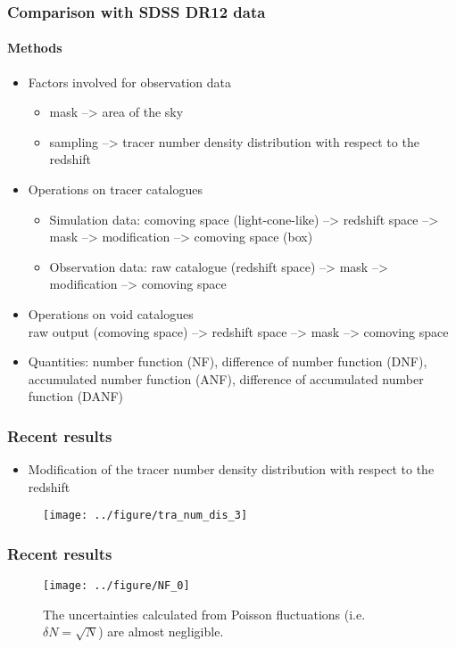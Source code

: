 \documentclass{beamer}
\newtheorem{Narrow down the analysis}{Narrow down the analysis}
\begin{document}
\begin{frame}
	\frametitle{Comparison with SDSS DR12 data}
	\framesubtitle{Methods}
	\begin{itemize}
	\pause \item Factors involved for observation data
	\begin{itemize}
	 \pause \item mask --> area of the sky
	 \pause \item sampling --> tracer number density distribution with respect to the redshift
	\end{itemize}	
	\pause \item Operations on tracer catalogues
	\begin{itemize}
	\pause \item Simulation data: comoving space (light-cone-like) --> redshift space --> mask --> modification --> comoving space (box)
	\pause \item Observation data: raw catalogue (redshift space) --> mask --> modification --> comoving space
	\end{itemize}
	\pause \item Operations on void catalogues\\
	raw output (comoving space) --> redshift space --> mask --> comoving space
	\pause \item Quantities: number function (NF), difference of number function (DNF), accumulated number function (ANF), difference of accumulated number function (DANF)
	\end{itemize}
	
\end{frame}

\begin{frame}
	\frametitle{Recent results}
	\begin{itemize}
	\item Modification of the tracer number density distribution with respect to the redshift
	\end{itemize}
	\begin{figure}
\centering
\texttt{[image: ../figure/tra\_num\_dis\_3]}
\label{ex1}
\end{figure}
\end{frame}

\begin{frame}
	\frametitle{Recent results}
\begin{figure}
\centering
\texttt{[image: ../figure/NF\_0]}
\caption{The uncertainties calculated from Poisson fluctuations (i.e. $\delta N=\sqrt{N}$) are almost negligible.}
\label{ex2}
\end{figure}
\end{frame}
\end{document}
